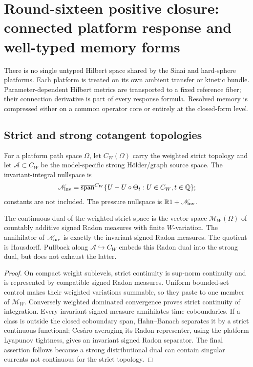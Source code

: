 \section{Round-sixteen positive closure: connected platform response and well-typed memory forms}
\label{sec:r16-c2}

There is no single untyped Hilbert space shared by the Sinai and hard-sphere
platforms.  Each platform is treated on its own ambient transfer or kinetic
bundle.  Parameter-dependent Hilbert metrics are transported to a fixed
reference fiber; their connection derivative is part of every response
formula.  Resolved memory is compressed either on a common operator core or
entirely at the closed-form level.

\subsection{Strict and strong cotangent topologies}

For a platform path space \(\Omega\), let \(C_W(\Omega)\) carry the weighted
strict topology and let \(\mathscr A\subset C_W\) be the model-specific strong
H\"older/graph source space.  The invariant-integral nullspace is
\[
 \mathscr N_{\rm inv}=
 \overline{\operatorname{span}}^{C_W}
 \{U-U\circ\Theta_t:U\in C_W,t\in\mathbb Q\};
\]
constants are not included.  The pressure nullspace is
\(\mathbb R1+\mathscr N_{\rm inv}\).

\begin{theorem}
\label{thm:r16-c2-dual}
The continuous dual of the weighted strict space is the vector space
\(\mathcal M_W(\Omega)\) of countably additive signed Radon measures with
finite \(W\)-variation.  The annihilator of
\(\mathscr N_{\rm inv}\) is exactly the invariant signed Radon measures.
The quotient is Hausdorff.  Pullback along
\(\mathscr A\hookrightarrow C_W\) embeds this Radon dual into the strong dual,
but does not exhaust the latter.
\end{theorem}

\begin{proof}
On compact weight sublevels, strict continuity is sup-norm continuity and is
represented by compatible signed Radon measures.  Uniform bounded-set control
makes their weighted variations summable, so they paste to one member of
\(\mathcal M_W\).  Conversely weighted dominated convergence proves strict
continuity of integration.  Every invariant signed measure annihilates time
coboundaries.  If a class is outside the closed coboundary span, Hahn--Banach
separates it by a strict continuous functional; Ces\`aro averaging its Radon
representer, using the platform Lyapunov tightness, gives an invariant signed
Radon separator.  The final assertion follows because a strong distributional
dual can contain singular currents not continuous for the strict topology.
\end{proof}

